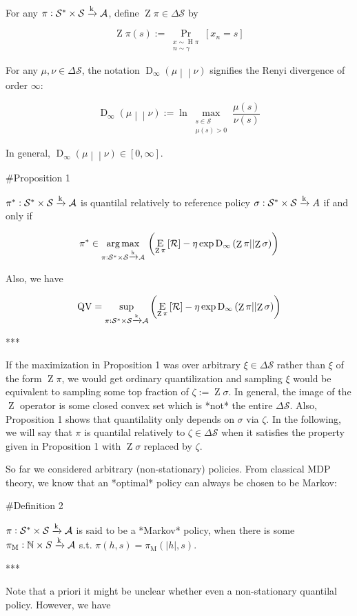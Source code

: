 \documentclass[a4paper]{article}
\newcommand{\AP}[1]{\left(#1\right)}
\newcommand{\AB}[1]{\left[#1\right]}
\newcommand{\Pa}[2]{\underset{#1}{\operatorname{Pr}}\AB{#2}}
\newcommand{\Ea}[2]{\underset{#1}{\operatorname{E}}\AB{#2}}
\newcommand{\RD}[3]{\operatorname{D}_{#1}\AP{#2\middle\vert\middle\vert#3}}
\newcommand{\Argmax}[1]{\underset{#1}{\operatorname{arg\,max}}\,}
\newcommand{\Nats}{\mathbb{N}}
\newcommand{\Abs}[1]{\left\vert #1 \right\vert}
\newcommand{\K}{\xrightarrow{\textnormal{k}}}
\newcommand{\A}{\mathcal{A}}
\newcommand{\St}{\mathcal{S}}
\newcommand{\R}{\mathcal{R}}
\newcommand{\QV}{\operatorname{QV}}
\DeclareMathOperator{\Hi}{H}
\DeclareMathOperator{\Z}{Z}
\begin{document}
For any $\pi: \St^*\times\St \K \A$, define $\Z{\pi}\in\Delta\St$ by

$$\Z{\pi}(s):=\Pa{\substack{x\sim\Hi{\pi}\\n\sim\gamma}}{x_n=s}$$

For any $\mu,\nu\in\Delta\St$, the notation $\RD{\infty}{\mu}{\nu}$ signifies the Renyi divergence of order $\infty$:

$$\RD{\infty}{\mu}{\nu} := \ln \max_{\substack{s\in\St \\ \mu(s)> 0}}\frac{\mu(s)}{\nu(s)}$$

In general, $\RD{\infty}{\mu}{\nu} \in [0,\infty]$. 

\#Proposition 1

$\pi^* : \St^*\times\St \K \A$ is quantilal relatively to reference policy $\sigma: \St^*\times\St \K A$ if and only if

$$\pi^* \in \Argmax{\pi: \St^*\times\St \K \A}\AP{\Ea{\Z{\pi}}{\R}-\eta \exp{\RD{\infty}{\Z{\pi}}{\Z{\sigma}}}}$$

Also, we have

$$\QV = \sup_{\pi: \St^*\times\St \K \A}\AP{\Ea{\Z{\pi}}{\R}-\eta \exp{\RD{\infty}{\Z{\pi}}{\Z{\sigma}}}}$$

***

If the maximization in Proposition 1 was over arbitrary $\xi \in \Delta\St$ rather than $\xi$ of the form $\Z{\pi}$, we would get ordinary quantilization and sampling $\xi$ would be equivalent to sampling some top fraction of $\zeta:=\Z{\sigma}$. In general, the image of the $\Z$ operator is some closed convex set which is *not* the entire $\Delta\St$.  Also, Proposition 1 shows that quantilality only depends on $\sigma$ via $\zeta$. In the following, we will say that $\pi$ is quantilal relatively to $\zeta\in\Delta\St$ when it satisfies the property given in Proposition 1 with $\Z{\sigma}$ replaced by $\zeta$.

So far we considered arbitrary (non-stationary) policies. From classical MDP theory, we know that an *optimal* policy can always be chosen to be Markov:

\#Definition 2

$\pi: \St^* \times \St \K \A$ is said to be a *Markov* policy, when there is some $\pi_\text{M}: \Nats \times S \K \A$ s.t. $\pi(h,s)=\pi_\text{M}\AP{\Abs{h},s}$.

***

Note that a priori it might be unclear whether even a non-stationary quantilal policy. However, we have
\end{document}
